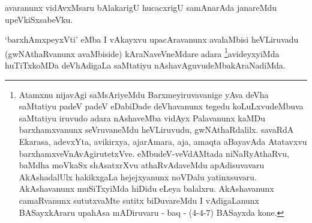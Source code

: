 \begin{artha}
avaranunx vidAvxMsaru bAlakarigU hucacxrigU samAnarAda janareMdu
upeVkiSxsabeVku.
\end{artha}


\begin{artha}
`barxhAmxpeyxVti' eMba I vAkayxvu upacAravanunx avalaMbisi heVLiruvadu
(gwNAthaRvanunx avaMbiside) kAraNaveVneMdare adara \footnote{Atamxnu nijavAgi saMsAriyeMdu Barxmeyiruvavanige yAva
deVha saMtatiyu padeV padeV eDabiDade deVhavanunx tegedu
koLuLxvudeMbuva saMtatiyu iruvudo adara nAshaveMba vidAyx
Palavanunx kaMDu barxhamxvanunx seVruvaneMdu heVLiruvudu,
gwNAthaRdalilx. savaRdA Ekarasa, adevxYta, avikirxya, ajarAmara,
aja, amaqta aBayavAda Atatavxvu
barxhamxveVnAvAgirutetxVve. eMbudeV-veVdAMtada niNaRyAthaRvu,
baMdha moVkaSx shAsatxrXvu athaRvAdaveMdu apAdisuvavaru
AkAshadalUlx hakikxgaLa hejejxyanunx noVDalu
yatinxsuvaru. AkAshavanunx muSiTxyiMda hiDidu eLeya balalxru.
AkAshavanunx camaRvanunx sututxvaMte sutitx biDuvareMdu I
vAdigaLanunx BASayxkAraru upahAsa mADiruvaru - baq - (4-4-7)
BASayxda kone.}avideyxyiMda huTiTxkoMDa deVhAdigaLa saMtatiyu
nAshavAguvudeMbakAraNadiMda.
\end{artha}
